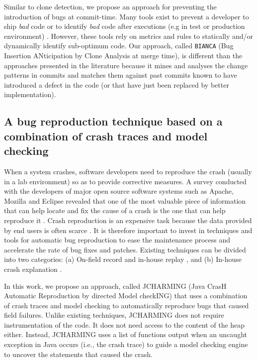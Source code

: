 Similar to clone detection, we propose an approach for preventing the introduction of bugs at commit-time.  Many tools exist to prevent a developer to ship {\it bad} code \cite{Dangel2000,Hovemeyer2007,Moha2010} or to identify {\it bad} code after executions (e.g in test or production environment) \cite{Nayrolles,Nayrolles2013a}. However, these tools rely on metrics and rules to statically and/or dynamically identify sub-optimum code. Our approach, called {\tt BIANCA} (Bug Insertion ANticipation by Clone Analysis at merge time), is different than the approaches presented in the literature because it mines and analyses the change patterns in commits and matches them against past commits known to have introduced a defect in the code (or that have just been replaced by better implementation). 

\subsection{A bug reproduction technique based on a combination of crash traces and model checking}
When a system crashes, software developers need to reproduce the crash (usually in a lab environment) so as to provide corrective measures. A survey conducted with the developers of major open source software systems such as Apache, Mozilla and Eclipse revealed that one of the most valuable piece of information that can help locate and fix the cause of a crash is the one that can help reproduce it \cite{Bettenburg2008}. Crash reproduction is  an expensive task because the data provided by end users is often scarce \cite{Artzi2008,Jin2012,Chen2013}. It is therefore important to invest in techniques and tools for automatic bug reproduction to ease the maintenance process and accelerate the rate of bug fixes and patches.
Existing techniques can be divided into two categories: (a) On-field record and in-house replay \cite{Steven2000,Narayanasamy2005,Artzi2008,Roehm2015}, and (b) In-house crash explanation \cite{Jin2012,Jin2013,Zuddas2014,Chen2013a,Nayrolles2015}.

In this work, we propose an approach, called JCHARMING (Java CrasH Automatic Reproduction by directed Model checkING) that uses a combination of crash traces and model checking to automatically reproduce bugs that caused field failures.
Unlike existing techniques, JCHARMING does not require instrumentation of the code.
It does not need access to the content of the heap either.
Instead, JCHARMING uses a list of functions output when an uncaught exception in Java occurs (i.e., the crash trace) to guide a model checking engine to uncover the statements that caused the crash.

